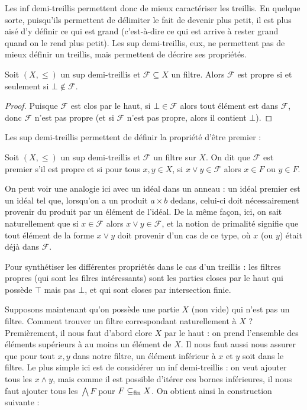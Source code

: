 Les inf demi-treillis permettent donc de mieux caractériser les treillis. En
quelque sorte, puisqu'ils permettent de délimiter le fait de devenir plus petit,
il est plus aisé d'y définir ce qui est grand (c'est-à-dire ce qui est arrive à
rester grand quand on le rend plus petit). Les sup demi-treillis, eux, ne
permettent pas de mieux définir un treillis, mais permettent de décrire ses
propriétés.

\begin{property}
  Soit $(X,\leq)$ un sup demi-treillis et $\mathcal F \subseteq X$ un filtre.
  Alors $\mathcal F$ est propre si et seulement si $\bot\notin\mathcal F$.
\end{property}

\begin{proof}
  Puisque $\mathcal F$ est clos par le haut, si $\bot\in\mathcal F$ alors tout
  élément est dans $\mathcal F$, donc $\mathcal F$ n'est pas propre (et si
  $\mathcal F$ n'est pas propre, alors il contient $\bot$).
\end{proof}

Les sup demi-treillis permettent de définir la propriété d'être premier :

\begin{definition}
  Soit $(X,\leq)$ un sup demi-treillis et $\mathcal F$ un filtre sur $X$. On dit
  que $\mathcal F$ est premier s'il est propre et si pour tous $x,y\in X$, si
  $x\lor y \in \mathcal F$ alors $x\in F$ ou $y\in F$.
\end{definition}

On peut voir une analogie ici avec un idéal dans un anneau : un idéal premier
est un idéal tel que, lorsqu'on a un produit $a\times b$ dedans, celui-ci doit
nécessairement provenir du produit par un élément de l'idéal. De la même façon,
ici, on sait naturellement que si $x\in\mathcal F$ alors $x\lor y \in\mathcal F$,
et la notion de primalité signifie que tout élément de la forme $x\lor y$ doit
provenir d'un cas de ce type, où $x$ (ou $y$) était déjà dans $\mathcal F$.

Pour synthétiser les différentes propriétés dans le cas d'un treillis : les
filtres propres (qui sont les filres intéressants) sont les parties closes par
le haut qui possède $\top$ mais pas $\bot$, et qui sont closes par intersection
finie.

Supposons maintenant qu'on possède une partie $X$ (non vide) qui n'est pas un
filtre. Comment trouver un filtre correspondant naturellement à $X$ ?
Premièrement, il nous faut d'abord clore $X$ par le haut : on prend l'ensemble
des éléments supérieurs à au moins un élément de $X$. Il nous faut aussi nous
assurer que pour tout $x,y$ dans notre filtre, un élément inférieur à $x$ et $y$
soit dans le filtre. Le plus simple ici est de considérer un inf demi-treillis :
on veut ajouter tous les $x\land y$, mais comme il est possible d'itérer ces
bornes inférieures, il nous faut ajouter tous les $\bigwedge F$ pour
$F\subseteq_{\mathrm{fin}} X$. On obtient ainsi la construction suivante :

